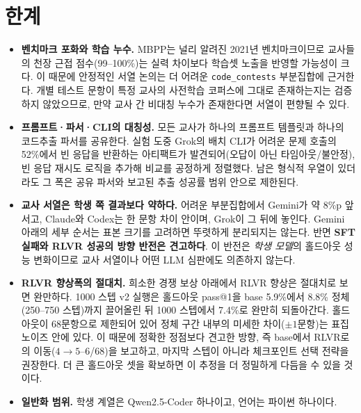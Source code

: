 \documentclass[11pt]{article}
\begin{document}
\section{한계}
\label{sec:limits}
\begin{itemize}
  \item \textbf{벤치마크 포화와 학습 누수.} MBPP는 널리 알려진 2021년 벤치마크이므로 교사들의 천장 근접 점수(99--100\%)는 실력 차이보다 학습셋 노출을 반영할 가능성이 크다. 이 때문에 안정적인 서열 논의는 더 어려운 \texttt{code\_contests} 부분집합에 근거한다. 개별 테스트 문항이 특정 교사의 사전학습 코퍼스에 그대로 존재하는지는 검증하지 않았으므로, 만약 교사 간 비대칭 누수가 존재한다면 서열이 편향될 수 있다.

  \item \textbf{프롬프트·파서·CLI의 대칭성.} 모든 교사가 하나의 프롬프트 템플릿과 하나의 코드추출 파서를 공유한다. 실험 도중 Grok의 배치 CLI가 어려운 문제 호출의 52\%에서 빈 응답을 반환하는 아티팩트가 발견되어(오답이 아닌 타임아웃/불안정), 빈 응답 재시도 로직을 추가해 비교를 공정하게 정렬했다. 남은 형식적 우열이 있더라도 그 폭은 공유 파서와 보고된 추출 성공률 범위 안으로 제한된다.

  \item \textbf{교사 서열은 학생 쪽 결과보다 약하다.} 어려운 부분집합에서 Gemini가 약 8\%p 앞서고, Claude와 Codex는 한 문항 차이 안이며, Grok이 그 뒤에 놓인다. Gemini 아래의 세부 순서는 표본 크기를 고려하면 뚜렷하게 분리되지는 않는다. 반면 \textbf{SFT 실패와 RLVR 성공의 방향 반전은 견고하다}. 이 반전은 \emph{학생 모델}의 홀드아웃 성능 변화이므로 교사 서열이나 어떤 LLM 심판에도 의존하지 않는다.

  \item \textbf{RLVR 향상폭의 절대치.} 희소한 경쟁 보상 아래에서 RLVR 향상은 절대치로 보면 완만하다. 1000 스텝 v2 실행은 홀드아웃 pass@1을 base 5.9\%에서 8.8\% 정체(250--750 스텝)까지 끌어올린 뒤 1000 스텝에서 7.4\%로 완만히 되돌아간다. 홀드아웃이 68문항으로 제한되어 있어 정체 구간 내부의 미세한 차이($\pm 1$문항)는 표집 노이즈 안에 있다. 이 때문에 정확한 정점보다 견고한 방향, 즉 base에서 RLVR로의 이동($4 \to 5$--$6$/68)을 보고하고, 마지막 스텝이 아니라 체크포인트 선택 전략을 권장한다. 더 큰 홀드아웃 셋을 확보하면 이 추정을 더 정밀하게 다듬을 수 있을 것이다.

  \item \textbf{일반화 범위.} 학생 계열은 Qwen2.5-Coder 하나이고, 언어는 파이썬 하나이다.


\end{itemize}
\end{document}
